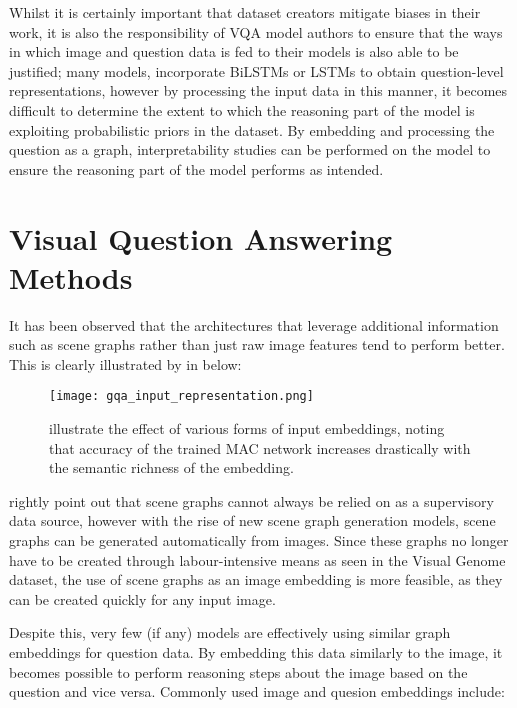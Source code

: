 Whilst it is certainly important that dataset creators mitigate biases in their work, it is also the responsibility of VQA model authors to ensure that the ways in which image and question data is fed to their models is also able to be justified; many models,  incorporate BiLSTMs \cite{hudson2018compositional} or LSTMs \cite{andreas2016neural} to obtain question-level representations, however by processing the input data in this manner, it becomes difficult to determine the extent to which the reasoning part of the model is exploiting probabilistic priors in the dataset. By embedding and processing the question as a graph, interpretability studies can be performed on the model to ensure the reasoning part of the model performs as intended.

\section{Visual Question Answering Methods}
\label{section:vqa_methods}

It has been observed that the architectures that leverage additional information such as scene graphs rather than just raw image features tend to perform better. This is clearly illustrated by \citeauthor{hudson2019gqa_preprint} in \figureautorefname{ \ref{fig:gqa_input_representation}} below:

\begin{figure}[H]
    \centering
    \texttt{[image: gqa\_input\_representation.png]}
    \caption{\citeauthor{hudson2019gqa_preprint} illustrate the effect of various forms of input embeddings, noting that accuracy of the trained MAC network \cite{hudson2018compositional} increases drastically with the semantic richness of the embedding.}
    \label{fig:gqa_input_representation}
\end{figure}

\citeauthor{hudson2018compositional} rightly point out that scene graphs cannot always be relied on as a supervisory data source, however with the rise of new scene graph generation models, scene graphs can be generated automatically from images. Since these graphs no longer have to be created through labour-intensive means as seen in the Visual Genome dataset, the use of scene graphs as an image embedding is more feasible, as they can be created quickly for any input image.

\vspace{\baselineskip}

Despite this, very few (if any) models are effectively using similar graph embeddings for question data. By embedding this data similarly to the image, it becomes possible to perform reasoning steps about the image based on the question and vice versa. Commonly used image and quesion embeddings include:

